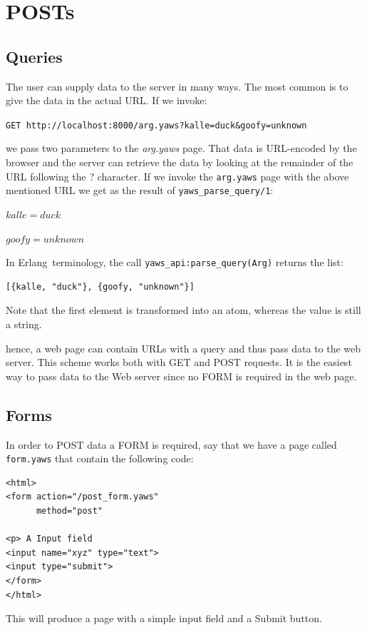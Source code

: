 \documentclass[11pt,oneside,english]{book}
\newcommand{\Erlang}            %
        {{\sc Erlang}}
\begin{document}
\section{POSTs}

\subsection{Queries}

The user can supply data to the server in many ways. The most
common is to give the data in the actual URL.
If we invoke:

\verb+GET http://localhost:8000/arg.yaws?kalle=duck&goofy=unknown+

we pass two parameters to the \textit{arg.yaws} page.
That data is URL-encoded by the browser and the server can retrieve the
data by looking at the remainder of the URL following the ? character.
If we invoke the \verb+arg.yaws+ page with the above mentioned URL we get
as the result of \verb+yaws_parse_query/1+:

$kalle = duck$

$goofy = unknown$

In \Erlang\  terminology, the call \verb+yaws_api:parse_query(Arg)+ returns
the list:
\begin{verbatim}
[{kalle, "duck"}, {goofy, "unknown"}]
\end{verbatim}

Note that the first element is transformed into an atom, whereas the value
is still a string.

hence, a web page can contain URLs with a query and thus pass data to the
web server. This scheme works both with GET and POST requests.
It is the easiest way to pass data to the Web server since no FORM is required
in the web page.


\subsection{Forms}

In order to POST data a FORM is required, say that we have a page called
\verb+form.yaws+ that contain the following code:

\begin{verbatim}
<html>
<form action="/post_form.yaws"
      method="post"

<p> A Input field
<input name="xyz" type="text">
<input type="submit">
</form>
</html>
\end{verbatim}

This will produce a page with a simple input field and a Submit button.
\end{document}
